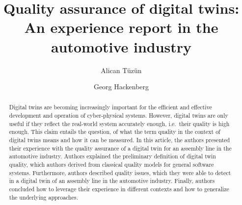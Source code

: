 \documentclass{llncs}
\begin{document}
    \title{Quality assurance of digital twins: An experience report in the automotive industry}

    \author{Alican Tüzün
    \and
    Georg Hackenberg
    }
    
    \maketitle

    \begin{abstract}
        Digital twins are becoming increasingly important for the efficient and effective development 
        and operation of cyber-physical systems.
        However, digital twins are only useful if they reflect the real-world system accurately enough,
        i.e.\ their quality is high enough.
        This claim entails the question, of what the term quality in the context of digital twins means and
        how it can be measured. In this article, the authors presented their experience with the quality assurance of a digital
        twin for an assembly line in the automotive industry.
        Authors explained the preliminary definition of digital twin quality, 
        which authors derived from classical quality models for general software systems.
        Furthermore, authors described quality issues, 
        which they were able to detect in a digital twin of an assembly line in the automotive industry.
        Finally, authors concluded how to leverage their experience in different contexts 
        and how to generalize the underlying approaches.
    \end{abstract}
\end{document}
